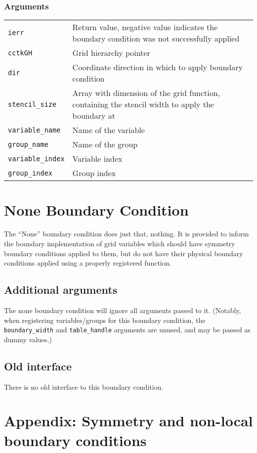\documentclass{article}
\begin{document}
\subsubsection*{Arguments}
\begin{tabular}{ll}
{\tt ierr} & Return value, negative value indicates the
boundary condition was not successfully applied\\
{\tt cctkGH} & Grid hierarchy pointer\\
{\tt dir} & Coordinate direction in which to apply boundary condition\\
{\tt stencil\_size} & Array with dimension of the grid function, containing the stencil width to apply the boundary at\\
{\tt variable\_name} & Name of the variable\\
{\tt group\_name} & Name of the group\\
{\tt variable\_index} & Variable index\\
{\tt group\_index} & Group index\\
\end{tabular}


\section{None Boundary Condition}

The ``None'' boundary condition does just that, nothing.  It is
provided to inform the boundary implementation of grid variables which
should have symmetry boundary conditions applied to them, but do not
have their physical boundary conditions applied using a properly
registered function.

\subsection{Additional arguments}

The none boundary condition will ignore all arguments passed to it.
(Notably, when registering variables/groups for this boundary condition,
the \verb|boundary_width| and \verb|table_handle| arguments are unused,
and may be passed as dummy values.)


\subsection{Old interface}

There is no old interface to this boundary condition.


\section{Appendix: Symmetry and non-local boundary conditions}
\label{Boundary/apx:symmetry}
\end{document}
